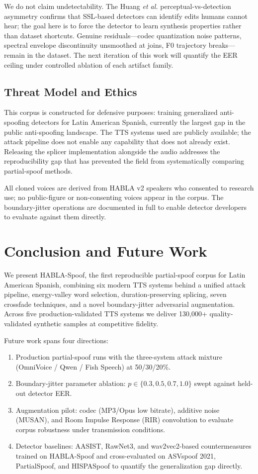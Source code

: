 \documentclass[conference]{IEEEtran}
\begin{document}
We do not claim undetectability. The Huang \emph{et al.} \cite{huang2024detectable} perceptual-vs-detection asymmetry confirms that SSL-based detectors can identify edits humans cannot hear; the goal here is to force the detector to learn synthesis properties rather than dataset shortcuts. Genuine residuals---codec quantization noise patterns, spectral envelope discontinuity unsmoothed at joins, F0 trajectory breaks---remain in the dataset. The next iteration of this work will quantify the EER ceiling under controlled ablation of each artifact family.

\subsection{Threat Model and Ethics}

This corpus is constructed for defensive purposes: training generalized anti-spoofing detectors for Latin American Spanish, currently the largest gap in the public anti-spoofing landscape. The TTS systems used are publicly available; the attack pipeline does not enable any capability that does not already exist. Releasing the splicer implementation alongside the audio addresses the reproducibility gap that has prevented the field from systematically comparing partial-spoof methods.

All cloned voices are derived from HABLA v2 speakers who consented to research use; no public-figure or non-consenting voices appear in the corpus. The boundary-jitter operations are documented in full to enable detector developers to evaluate against them directly.

\section{Conclusion and Future Work}

We present HABLA-Spoof, the first reproducible partial-spoof corpus for Latin American Spanish, combining six modern TTS systems behind a unified attack pipeline, energy-valley word selection, duration-preserving splicing, seven crossfade techniques, and a novel boundary-jitter adversarial augmentation. Across five production-validated TTS systems we deliver 130{,}000+ quality-validated synthetic samples at competitive fidelity.

Future work spans four directions:
\begin{enumerate}
    \item Production partial-spoof runs with the three-system attack mixture (OmniVoice / Qwen / Fish Speech) at 50/30/20\%.
    \item Boundary-jitter parameter ablation: $p \in \{0.3, 0.5, 0.7, 1.0\}$ swept against held-out detector EER.
    \item Augmentation pilot: codec (MP3/Opus low bitrate), additive noise (MUSAN), and Room Impulse Response (RIR) convolution to evaluate corpus robustness under transmission conditions.
    \item Detector baselines: AASIST, RawNet3, and wav2vec2-based countermeasures trained on HABLA-Spoof and cross-evaluated on ASVspoof 2021, PartialSpoof, and HISPASpoof to quantify the generalization gap directly.
\end{enumerate}
\end{document}
